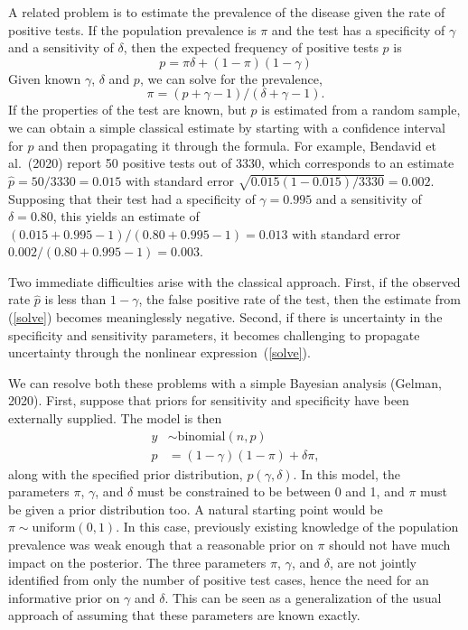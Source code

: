\documentclass[11pt]{article}
\begin{document}
A related problem is to estimate the prevalence of the disease given
the rate of positive tests.  If the population prevalence is $\pi$ and
the test has a specificity of $\gamma$ and a sensitivity of $\delta$,
then the expected frequency of positive tests $p$ is
%
\begin{equation*}
  p = \pi \delta + (1- \pi)(1-\gamma)
\end{equation*}
%
Given known $\gamma$, $\delta$ and $p$, we can solve for the prevalence,
%
\begin{equation}\label{solve}
  \pi=(p + \gamma - 1)/(\delta + \gamma - 1).
\end{equation}
%
If the properties of the test are known, but $p$ is estimated from a
random sample, we can obtain a simple classical estimate by starting
with a confidence interval for $p$ and then propagating it through the
formula.  For example, Bendavid et al.\ (2020) report 50 positive
tests out of 3330, which corresponds to an estimate
$\hat{p}=50/3330=0.015$ with standard error
$\sqrt{0.015(1-0.015)/3330}=0.002$.  Supposing that their test had a
specificity of $\gamma=0.995$ and a sensitivity of $\delta=0.80$, this
yields an estimate of $(0.015 + 0.995 - 1)/(0.80 + 0.995 -1) = 0.013$
with standard error $0.002/(0.80 + 0.995 -1) = 0.003$.

Two immediate difficulties arise with the classical approach.  First,
if the observed rate $\hat{p}$ is less than $1-\gamma$, the false
positive rate of the test, then the estimate from (\ref{solve})
becomes meaninglessly negative.  Second, if there is uncertainty in
the specificity and sensitivity parameters, it becomes challenging to
propagate uncertainty through the nonlinear expression~(\ref{solve}).

We can resolve both these problems with a simple Bayesian analysis
(Gelman, 2020).  First, suppose that priors for sensitivity and
specificity have been externally supplied.  The model is then
% 
\begin{align}
\nonumber  y & \sim \mbox{binomial} (n, p) \\
 p & = (1-\gamma)(1- \pi)+ \delta\pi , \label{normals} 
\end{align}
%
along with the specified prior distribution, $p(\gamma,\delta)$.  In
this model, the parameters $\pi$, $\gamma$, and $\delta$ must be
constrained to be between 0 and 1, and $\pi$ must be given a prior
distribution too.  A natural starting point would be
$\pi\sim \mbox{uniform}(0,1)$.  In this case, previously existing
knowledge of the population prevalence was weak enough that a reasonable prior
on $\pi$ should not have much impact on the
posterior.  The three parameters $\pi$, $\gamma$, and $\delta$, are
not jointly identified from only the number of positive test cases,
hence the need for an informative prior on $\gamma$ and $\delta$. This
can be seen as a generalization of the usual approach of assuming that
these parameters are known exactly.
\end{document}
